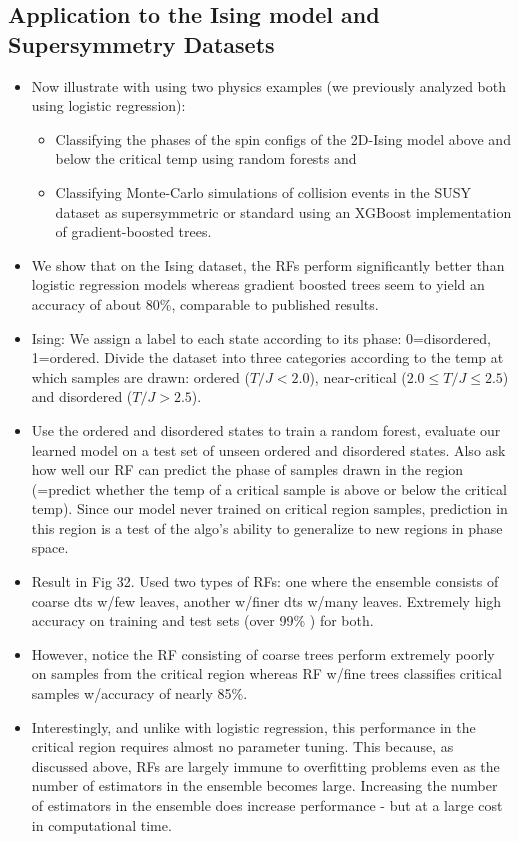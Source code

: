 \documentclass[norsk,a4paper,11pt]{article}
\begin{document}
\subsection{Application to the Ising model and Supersymmetry Datasets}
\begin{itemize}
	\item Now illustrate with using two physics examples (we previously analyzed both using logistic regression):
	\begin{itemize}
		\item Classifying the phases of the spin configs of the 2D-Ising model above and below the critical temp using random forests and
		\item Classifying Monte-Carlo simulations of collision events in the SUSY dataset as supersymmetric or standard using an XGBoost implementation of gradient-boosted trees.
	\end{itemize}
	\item We show that on the Ising dataset, the RFs perform significantly better than logistic regression models whereas gradient boosted trees seem to yield an accuracy of about 80\%, comparable to published results.
	\item Ising: We assign a label to each state according to its phase: 0=disordered, 1=ordered. Divide the dataset into three categories according to the temp at which samples are drawn: ordered ($T/J < 2.0$), near-critical ($2.0 \leq T/J \leq 2.5$) and disordered ($T/J > 2.5$).
	\item Use the ordered and disordered states to train a random forest, evaluate our learned model on a test set of unseen ordered and disordered states. Also ask how well our RF can predict the phase of samples drawn in the region (=predict whether the temp of a critical sample is above or below the critical temp). Since our model never trained on critical region samples, prediction in this region is a test of the algo's ability to generalize to new regions in phase space.
	\item Result in Fig 32. Used two types of RFs: one where the ensemble consists of coarse dts w/few leaves, another w/finer dts w/many leaves. Extremely high accuracy on training and test sets (over 99\% ) for both. 
	\item However, notice the RF consisting of coarse trees perform extremely poorly on samples from the critical region whereas RF w/fine trees classifies critical samples w/accuracy of nearly 85\%. 
	\item Interestingly, and unlike with logistic regression, this performance in the critical region requires almost no parameter tuning. This because, as discussed above, RFs are largely immune to overfitting problems even as the number of estimators in the ensemble becomes large. Increasing the number of estimators in the ensemble does increase performance - but at a large cost in computational time.

\end{itemize}
\end{document}
